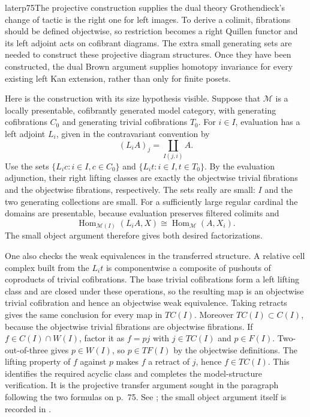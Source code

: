 \begin{dcomment}{later}{p75}{The projective construction supplies the dual theory}
Grothendieck's change of tactic is the right one for left images. To derive a colimit, fibrations should be defined objectwise, so restriction becomes a right Quillen functor and its left adjoint acts on cofibrant diagrams. The extra small generating sets are needed to construct these projective diagram structures. Once they have been constructed, the dual Brown argument supplies homotopy invariance for every existing left Kan extension, rather than only for finite posets.

Here is the construction with its size hypothesis visible. Suppose that $\mathcal M$ is a locally presentable, cofibrantly generated model category, with generating cofibrations $C_0$ and generating trivial cofibrations $T_0$. For $i\in I$, evaluation has a left adjoint $L_i$, given in the contravariant convention by
\[
                         (L_iA)_j=\coprod_{I(j,i)}A.
\]
Use the sets $\{L_ic:i\in I,c\in C_0\}$ and $\{L_it:i\in I,t\in T_0\}$. By the evaluation adjunction, their right lifting classes are exactly the objectwise trivial fibrations and the objectwise fibrations, respectively. The sets really are small: $I$ and the two generating collections are small. For a sufficiently large regular cardinal the domains are presentable, because evaluation preserves filtered colimits and
\[
 \operatorname{Hom}_{\mathcal M(I)}(L_iA,X)
                        \cong\operatorname{Hom}_{\mathcal M}(A,X_i).
\]
The small object argument therefore gives both desired factorizations.

One also checks the weak equivalences in the transferred structure. A relative cell complex built from the $L_it$ is componentwise a composite of pushouts of coproducts of trivial cofibrations. The base trivial cofibrations form a left lifting class and are closed under these operations, so the resulting map is an objectwise trivial cofibration and hence an objectwise weak equivalence. Taking retracts gives the same conclusion for every map in $TC(I)$. Moreover $TC(I)\subset C(I)$, because the objectwise trivial fibrations are objectwise fibrations. If $f\in C(I)\cap W(I)$, factor it as $f=pj$ with $j\in TC(I)$ and $p\in F(I)$. Two-out-of-three gives $p\in W(I)$, so $p\in TF(I)$ by the objectwise definitions. The lifting property of $f$ against $p$ makes $f$ a retract of $j$, hence $f\in TC(I)$. This identifies the required acyclic class and completes the model-structure verification. It is the projective transfer argument sought in the paragraph following the two formulas on p.~75. See \citet[Theorem 1.28 and Lemma 1.29]{Groth2013}; the small object argument itself is recorded in \citet[Theorem 2.1.14]{Hovey1999}.


\end{dcomment}
